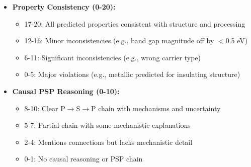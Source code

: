 \begin{table}[ht!]
\begin{itemize}[leftmargin=*,noitemsep,topsep=0pt]
    \item \textbf{Property Consistency (0-20):}
    \begin{itemize}[noitemsep]
        \item 17-20: All predicted properties consistent with structure and processing
        \item 12-16: Minor inconsistencies (e.g., band gap magnitude off by $<$0.5 eV)
        \item 6-11: Significant inconsistencies (e.g., wrong carrier type)
        \item 0-5: Major violations (e.g., metallic predicted for insulating structure)
    \end{itemize}

    \item \textbf{Causal PSP Reasoning (0-10):}
    \begin{itemize}[noitemsep]
        \item 8-10: Clear P$\rightarrow$S$\rightarrow$P chain with mechanisms and uncertainty
        \item 5-7: Partial chain with some mechanistic explanations
        \item 2-4: Mentions connections but lacks mechanistic detail
        \item 0-1: No causal reasoning or PSP chain
    \end{itemize}
\end{itemize}

\end{table}
